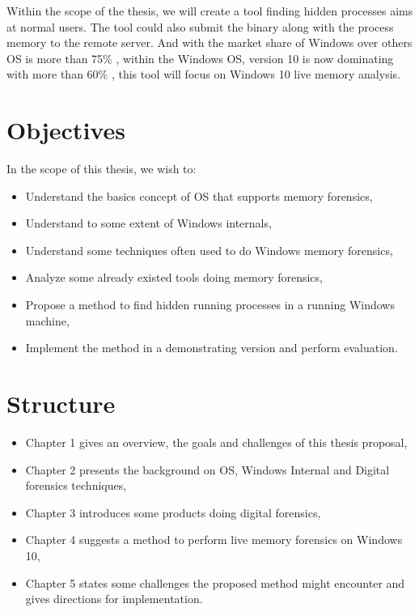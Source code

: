 Within the scope of the thesis, we will create a tool finding hidden processes
aims at normal users. The tool could also submit the binary along with the
process memory to the remote server. And with the market share of Windows over
others OS is more than 75\% \cite{osMarketShare}, within the Windows OS,
version 10 is now dominating with more than 60\% \cite{windowsShare}, this tool
will focus on Windows 10 live memory analysis.

\section[Objectives]{Objectives}

In the scope of this thesis, we wish to:

\begin{itemize}
  \item Understand the basics concept of OS that supports memory forensics,
  \item Understand to some extent of Windows internals,
  \item Understand some techniques often used to do Windows memory forensics,
  \item Analyze some already existed tools doing memory forensics,
  \item Propose a method to find hidden running processes in a running Windows machine,
  \item Implement the method in a demonstrating version and perform evaluation.
\end{itemize}

\newpage
\section[Structure]{Structure}

\begin{itemize}
  \item Chapter 1 gives an overview, the goals and challenges of this thesis proposal,
  \item Chapter 2 presents the background on OS, Windows Internal and Digital forensics techniques,
  \item Chapter 3 introduces some products doing digital forensics,
  \item Chapter 4 suggests a method to perform live memory forensics on Windows 10,
  \item Chapter 5 states some challenges the proposed method might encounter and gives directions for implementation.
\end{itemize}

